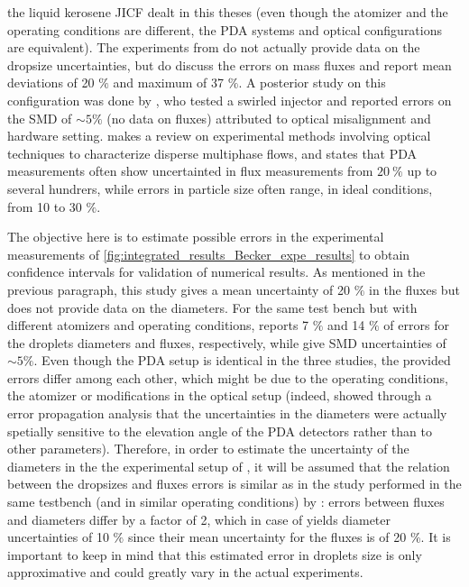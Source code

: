 the liquid kerosene JICF dealt in this theses (even though the atomizer and the operating conditions are different, the PDA systems and optical configurations are equivalent). The experiments from  do not actually provide data on the dropsize uncertainties, but do discuss the errors on mass fluxes and report mean deviations of 20 $\%$ and maximum of 37 $\%$. A posterior study on this configuration was done by , who tested a swirled injector and reported errors on the SMD of $\sim 5 \%$ (no data on fluxes) attributed to optical misalignment and hardware setting.  makes a review on experimental methods involving optical techniques to characterize disperse multiphase flows, and states that PDA measurements often show uncertainted in flux measurements from $20~\%$ up to several hundrers, while errors in particle size often range, in ideal conditions, from 10 to 30 $\%$. 

The objective here is to estimate possible errors in the experimental measurements of \ref{fig:integrated_results_Becker_expe_results} to obtain confidence intervals for validation of numerical results. As mentioned in the previous paragraph, this study gives a mean uncertainty of 20 $\%$ in the fluxes but does not provide data on the diameters. For the same test bench but with different atomizers and operating conditions,  reports 7 $\%$ and 14 $\%$ of errors for the droplets diameters and fluxes, respectively, while  give SMD uncertainties of $\sim 5 \%$. Even though the PDA setup is identical in the three studies, the provided errors differ among each other, which might be due to the operating conditions, the atomizer or modifications in the optical setup (indeed,  showed through a error propagation analysis that the uncertainties in the diameters were actually spetially sensitive to the elevation angle of the PDA detectors rather than to other parameters). Therefore, in order to estimate the uncertainty of the diameters in the the experimental setup of , it will be assumed that the relation between the dropsizes and fluxes errors is similar as in the study performed in the same testbench (and in similar operating conditions) by : errors between fluxes and diameters differ by a factor of 2, which in case of  yields diameter uncertainties of 10 $\%$ since their mean uncertainty for the fluxes is of 20 $\%$. It is important to keep in mind that this estimated error in droplets size is only approximative and could greatly vary in the actual experiments. \\ %

